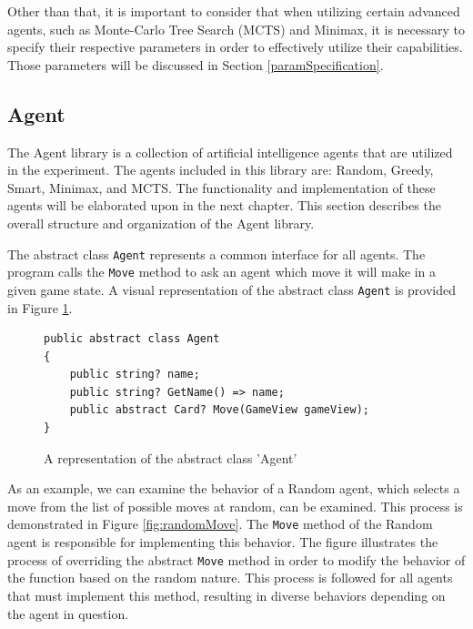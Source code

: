 Other than that, it is important to consider that when utilizing certain advanced agents, such as Monte-Carlo Tree Search (MCTS) and Minimax, it is necessary to specify their respective parameters in order to effectively utilize their capabilities. Those parameters will be discussed in Section \ref{paramSpecification}.

\subsection{Agent}

The Agent library is a collection of artificial intelligence agents that are utilized in the experiment. The agents included in this library are: Random, Greedy, Smart, Minimax, and MCTS. The functionality and implementation of these agents will be elaborated upon in the next chapter. This section describes the overall structure and organization of the Agent library.

The abstract class \texttt{Agent} represents a common interface for all agents. The program calls the \texttt{Move} method to ask an agent which move it will make in a given game state. A visual representation of the abstract class \texttt{Agent} is provided in Figure \ref{fig:abstractClass}.

\begin{figure}[h]
\captionsetup{justification=centering}
\begin{lstlisting}
public abstract class Agent
{
    public string? name;
    public string? GetName() => name;
    public abstract Card? Move(GameView gameView);
}
\end{lstlisting}
\caption{A representation of the abstract class 'Agent'}
\label{fig:abstractClass}
\end{figure}

As an example, we can examine the behavior of a Random agent, which selects a move from the list of possible moves at random, can be examined. This process is demonstrated in Figure \ref{fig:randomMove}. The \texttt{Move} method of the Random agent is responsible for implementing this behavior. The figure illustrates the process of overriding the abstract \texttt{Move} method in order to modify the behavior of the function based on the random nature. This process is followed for all agents that must implement this method, resulting in diverse behaviors depending on the agent in question.